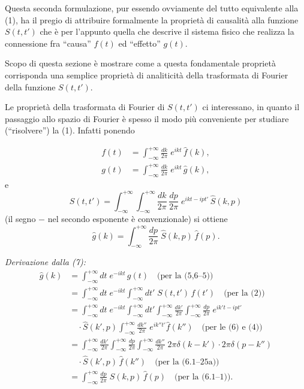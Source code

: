 \documentclass[11pt, a4paper]{book}
\numberwithin{equation}{section}
\begin{document}
Questa seconda formulazione, pur essendo ovviamente del tutto equivalente
alla (1), ha il pregio di attribuire formalmente la proprietà di causalità alla
funzione $S(t,t')$ che è per l'appunto quella che descrive il sistema fisico che
realizza la connessione fra ``causa'' $f(t)$ ed ``effetto'' $g(t)$.

Scopo di questa sezione è mostrare come a questa fondamentale proprietà
corrisponda una semplice proprietà di analiticità della trasformata di Fourier
della funzione $S(t,t')$.

Le proprietà della trasformata di Fourier di $S(t,t')$ ci interessano,
in quanto il passaggio allo spazio di Fourier è spesso il modo più conveniente
per studiare (``risolvere'') la (1). Infatti ponendo


\begin{align}
    f(t) &= \int_{-\infty}^{+\infty} \frac{dk}{2\pi}\; e^{ikt}\, \hat{f}(k), \tag{4}\\
    g(t) &= \int_{-\infty}^{+\infty} \frac{dk}{2\pi}\; e^{ikt}\, \hat{g}(k), \tag{5}
\end{align}
e
\begin{equation}
    S(t,t') = \int_{-\infty}^{+\infty}\int_{-\infty}^{+\infty}
    \frac{dk}{2\pi}\,\frac{dp}{2\pi}\; e^{ikt - ipt'}\, \hat{S}(k,p) \tag{6}
\end{equation}
(il segno $-$ nel secondo esponente è convenzionale) si ottiene
\begin{equation}
    \hat{g}(k) = \int_{-\infty}^{+\infty} \frac{dp}{2\pi}\; \hat{S}(k,p)\,\hat{f}(p). \tag{7}
\end{equation}

\medskip
\noindent\textit{Derivazione dalla (7):}
\begin{align*}
\hat{g}(k) &= \int_{-\infty}^{+\infty} dt\; e^{-ikt}\, g(t) \quad \text{(per la (5,6--5))}\\
&= \int_{-\infty}^{+\infty} dt\; e^{-ikt} \int_{-\infty}^{+\infty} dt'\; S(t,t')\, f(t') \quad \text{(per la (2))}\\
&= \int_{-\infty}^{+\infty} dt\; e^{-ikt} \int_{-\infty}^{+\infty} dt' \int_{-\infty}^{+\infty}\frac{dk'}{2\pi}
   \int_{-\infty}^{+\infty}\frac{dp}{2\pi}\; e^{ik't - ipt'} \\
&\quad \cdot \hat{S}(k',p) \int_{-\infty}^{+\infty}\frac{dk''}{2\pi}\; e^{ik''t'}\hat{f}(k'') \quad \text{(per le (6) e (4))}\\
&= \int_{-\infty}^{+\infty}\frac{dk'}{2\pi}\int_{-\infty}^{+\infty}\frac{dp}{2\pi}
   \int_{-\infty}^{+\infty}\frac{dk''}{2\pi}\; 2\pi\delta(k-k')\cdot 2\pi\delta(p-k'')\\
&\quad \cdot \hat{S}(k',p)\,\hat{f}(k'') \quad \text{(per la (6.1--25a))}\\
&= \int_{-\infty}^{+\infty}\frac{dp}{2\pi}\;\hat{S}(k,p)\,\hat{f}(p) \quad \text{(per la (6.1--1)).}
\end{align*}
\end{document}
